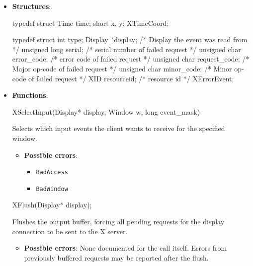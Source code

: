 \documentclass{report}
\begin{document}
    \pagebreak 
    \begin{itemize}
        \item \textbf{Structures}:
            \begin{cppcode}
                typedef struct {
                    Time time;
                    short x, y;
                } XTimeCoord;
            \end{cppcode}
            \begin{cppcode}
                typedef struct {
                    int type;
                    Display *display;                   /* Display the event was read from */
                    unsigned long serial;               /* serial number of failed request */
                    unsigned char error_code;           /* error code of failed request */
                    unsigned char request_code;         /* Major op-code of failed request */
                    unsigned char minor_code;           /* Minor op-code of failed request */
                    XID resourceid;                     /* resource id */
                } XErrorEvent;
            \end{cppcode}
    \item \textbf{Functions}:
        \begin{cppcode}
            XSelectInput(Display* display, Window w, long event_mask)
        \end{cppcode}
        \bigbreak \noindent
        Selects which input events the client wants to receive for the specified window.
        \begin{itemize}
            \item \textbf{Possible errors}:
                \begin{itemize}
                    \item \texttt{BadAccess}
                    \item \texttt{BadWindow}
                \end{itemize}
        \end{itemize}

        \begin{cppcode}
            XFlush(Display* display);
        \end{cppcode}
        \bigbreak \noindent
        Flushes the output buffer, forcing all pending requests for the display connection to be sent to the X server.

        \begin{itemize}
            \item \textbf{Possible errors}: None documented for the call itself. Errors from previously buffered requests may be reported after the flush.
        \end{itemize}


\end{itemize}
\end{document}
